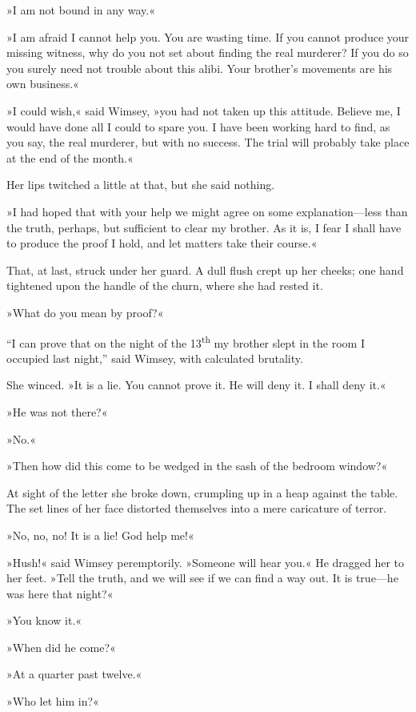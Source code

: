 »I am not bound in any way.«

»I am afraid I cannot help you. You are wasting time. If you cannot produce your missing witness, why do you not set about finding the real murderer? If you do so you surely need not trouble about this alibi.  Your brother's movements are his own business.«

»I could wish,« said Wimsey, »you had not taken up this attitude.  Believe me, I would have done all I could to spare you. I have been working hard to find, as you say, the real murderer, but with no success. The trial will probably take place at the end of the month.«

Her lips twitched a little at that, but she said nothing.

»I had hoped that with your help we might agree on some explanation\allowbreak---\allowbreak less than the truth, perhaps, but sufficient to clear my brother. As it is, I fear I shall have to produce the proof I hold, and let matters take their course.«

That, at last, struck under her guard. A dull flush crept up her cheeks; one hand tightened upon the handle of the churn, where she had rested it.

»What do you mean by proof?«

\enquote{I can prove that on the night of the 13\textsuperscript{th} my brother slept in the room I occupied last night,} said Wimsey, with calculated brutality.

She winced. »It is a lie. You cannot prove it. He will deny it. I shall deny it.«

»He was not there?«

»No.«

»Then how did this come to be wedged in the sash of the bedroom window?«

At sight of the letter she broke down, crumpling up in a heap against the table. The set lines of her face distorted themselves into a mere caricature of terror.

»No, no, no! It is a lie! God help me!«

»Hush!« said Wimsey peremptorily. »Someone will hear you.« He dragged her to her feet. »Tell the truth, and we will see if we can find a way out. It is true\allowbreak---\allowbreak he was here that night?«

»You know it.«

»When did he come?«

»At a quarter past twelve.«

»Who let him in?«

